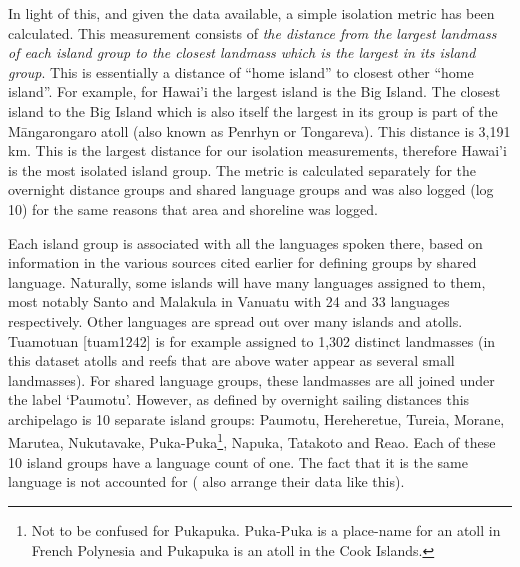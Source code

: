 \documentclass[a4paper,10pt]{article} %
\begin{document}
In light of this, and given the data available, a simple isolation metric has been calculated. This measurement consists of \textit{the distance from the largest landmass of each island group to the closest landmass which is the largest in its island group}. This is essentially a distance of ``home island'' to closest other ``home island''. For example, for Hawai'i the largest island is the Big Island. The closest island to the Big Island which is also itself the largest in its group is part of the M\={a}ngarongaro atoll (also known as Penrhyn or Tongareva). This distance is 3,191 km. This is the largest distance for our isolation measurements, therefore Hawai'i is the most isolated island group. The metric is calculated separately for the overnight distance groups and shared language groups and was also logged (log 10) for the same reasons that area and shoreline was logged.

Each island group is associated with all the languages spoken there, based on information in the various sources cited earlier for defining groups by shared language. Naturally, some islands will have many languages assigned to them, most notably Santo and Malakula in Vanuatu with 24 and 33 languages respectively. Other languages are spread out over many islands and atolls. Tuamotuan [tuam1242] is for example assigned to 1,302 distinct landmasses (in this dataset atolls and reefs that are above water appear as several small landmasses). For shared language groups, these landmasses are all joined under the label `Paumotu'. However, as defined by overnight sailing distances this archipelago is 10 separate island groups: Paumotu, Hereheretue, Tureia, Morane, Marutea, Nukutavake, Puka-Puka\footnote{Not to be confused for Pukapuka. Puka-Puka is a place-name for an atoll in French Polynesia and Pukapuka is an atoll in the Cook Islands.}, Napuka, Tatakoto and Reao. Each of these 10 island groups have a language count of one. The fact that it is the same language is not accounted for (\citet{gavin2012island} also arrange their data like this).
\end{document}
